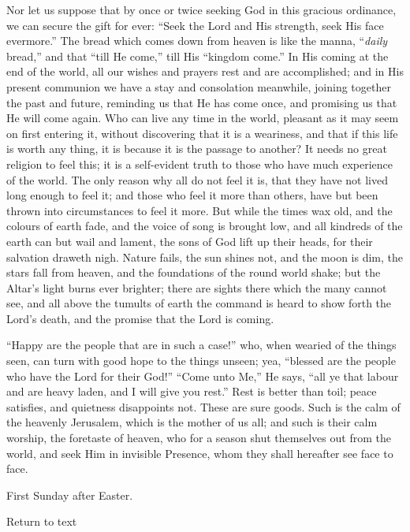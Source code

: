 Nor let us suppose that by once or twice seeking God in this
gracious ordinance, we can secure the gift for ever: ``Seek the
Lord and His strength, seek His face evermore.'' The bread which
comes down from heaven is like the manna, ``\emph{daily}
bread,'' and that ``till He come,'' till His ``kingdom
come.'' In His coming at the end of the world, all our wishes and
prayers rest and are accomplished; and in His present communion we
have a stay and consolation meanwhile, joining together the past and
future, reminding us that He has come once, and promising us that He
will come again. Who can live any time in the world, pleasant as it
may seem on first entering it, without discovering that it is a
weariness, and that if this life is worth any thing, it is because it
is the passage to another? It needs no great religion to feel this; it
is a self-evident truth to those who have much experience of the
world. The only reason why all do not feel it is, that they have not
lived long enough to feel it; and those who feel it more than others,
have but been thrown into circumstances to feel it more. But while the
times wax old, and the colours of earth fade, and the voice of song is
brought low, and all kindreds of the earth can but wail and lament,
the sons of God lift up their heads, for their salvation draweth nigh.
Nature fails, the sun shines not, and the moon is dim, the stars fall
from heaven, and the foundations of the round world shake; but the
Altar's light burns ever brighter; there are sights there which the
many cannot see, and all above the tumults of earth the command is
heard to show forth the Lord's death, and the promise that the Lord is
coming.

``Happy are the people that are in such a case!'' who, when
wearied of the things seen, can turn with good hope to the things
unseen; yea, ``blessed are the people who have the Lord for their
God!'' ``Come unto Me,'' He says, ``all ye that labour
and are heavy laden, and I will give you rest.'' Rest is better
than toil; peace satisfies, and quietness disappoints not. These are
sure goods. Such is the calm of the heavenly Jerusalem, which is the
mother of us all; and such is their calm worship, the foretaste of
heaven, who for a season shut themselves out from the world, and seek
Him in invisible Presence, whom they shall hereafter see face to face.


First Sunday after Easter.

Return to text

